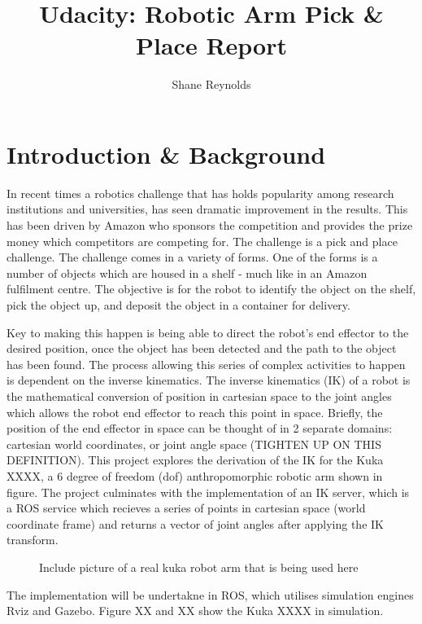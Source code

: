 \documentclass[a4paper]{article}
\begin{document}
\title{Udacity: Robotic Arm Pick \& Place Report}
\author{Shane Reynolds}
\maketitle

\section{Introduction \& Background}
In recent times a robotics challenge that has holds popularity among research institutions and universities, has seen dramatic improvement in the results. This has been driven by Amazon who sponsors the competition and provides the prize money which competitors are competing for. The challenge is a pick and place challenge. The challenge comes in a variety of forms. One of the forms is a number of objects which are housed in a shelf - much like in an Amazon fulfilment centre. The objective is for the robot to identify the object on the shelf, pick the object up, and deposit the object in a container for delivery.

Key to making this happen is being able to direct the robot's end effector to the desired position, once the object has been detected and the path to the object has been found. The process allowing this series of complex activities to happen is dependent on the inverse kinematics. The inverse kinematics (IK) of a robot is the mathematical conversion of position in cartesian space to the joint angles which allows the robot end effector to reach this point in space. Briefly, the position of the end effector in space can be thought of in 2 separate domains: cartesian world coordinates, or joint angle space (TIGHTEN UP ON THIS DEFINITION). This project explores the derivation of the IK for the Kuka XXXX, a 6 degree of freedom (dof) anthropomorphic robotic arm shown in figure. The project culminates with the implementation of an IK server, which is a ROS service which recieves a series of points in cartesian space (world coordinate frame) and returns a vector of joint angles after applying the IK transform.

\begin{figure}
\centering
\caption{Include picture of a real kuka robot arm that is being used here}
\end{figure}

The implementation will be undertakne in ROS, which utilises simulation engines Rviz and Gazebo. Figure XX and XX show the Kuka XXXX in simulation.
\end{document}
